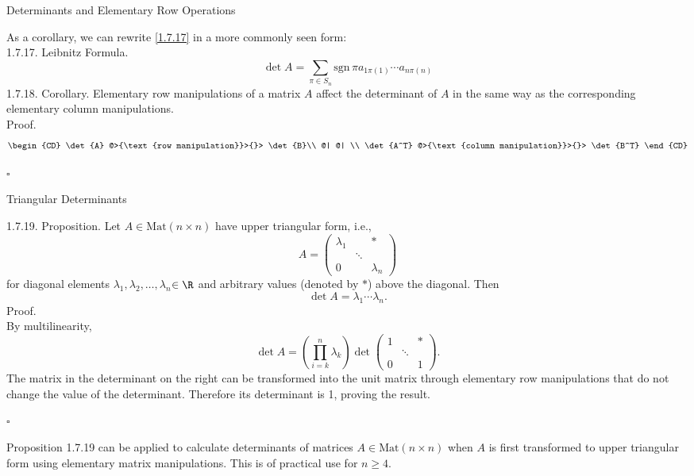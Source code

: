 \documentclass[smaller,hyperref={CJKbookmarks=true}]{beamer}
\newcommand{\myseries}[2]{$#1_1,#1_2,\dots,#1_#2$}
\begin{document}
\begin{frame}[t]{Determinants and Elementary Row Operations}
\begin{spacing}{1.05}
As a corollary, we can rewrite \eqref{1.7.17} in a more commonly seen form:\\
\alert{1.7.17. Leibnitz Formula.}
\begin{equation}\label{1.7.19}
  \det A=\sum_{\pi\in S_n}\text{sgn}\,\pi a_{1\pi(1)}\cdots a_{n\pi(n)}
\end{equation}
\alert{1.7.18. Corollary.} Elementary row manipulations of a matrix $A$ af{}fect the
determinant of $A$ in the same way as the corresponding elementary column
manipulations.\\[6pt]
\alert{Proof.}
\[
\begin{CD}
\det{A} @>{\text{row manipulation}}>{}> \det{B}\\
@| @| \\
\det{A^T} @>{\text{column manipulation}}>{}> \det{B^T}
\end{CD}
\]
\begin{flushright}
  $\square$
\end{flushright}
\end{spacing}
\end{frame}
\begin{frame}{Triangular Determinants}
\begin{spacing}{1.05}
\vspace*{19pt}
\alert{1.7.19. Proposition.} Let $A\in\text{Mat}(n\times n)$ have upper triangular form, i.e.,
\[A=\begin{pmatrix}
      \lambda_1 &  & * \\
       & \ddots &  \\
      0 &   & \lambda_n
    \end{pmatrix}\]
for diagonal elements \myseries{\lambda}{n}$\in\R$ and arbitrary values (denoted by $*$) above the diagonal. Then
\vspace*{13pt}
\[\det A=\lambda_1\cdots\lambda_n.\]
\newpage
\alert{Proof.}\\
By multilinearity,
\[\det A=\left(\prod_{i=k}^{n}\lambda_k\right)\det\begin{pmatrix}
                                             1 &  & * \\
                                              & \ddots &  \\
                                             0 &  & 1
                                           \end{pmatrix}.\]
The matrix in the determinant on the right can be transformed into the
unit matrix through elementary row manipulations that do not change the
value of the determinant. Therefore its determinant is 1, proving the
result.
\begin{flushright}
  $\square$
\end{flushright}
Proposition 1.7.19 can be applied to calculate determinants of matrices $A\in\text{Mat}(n\times n)$ when $A$ is first transformed to upper triangular form using elementary matrix manipulations. This is of practical use for $n\geq 4$.
\end{spacing}
\end{frame}
\end{document}
